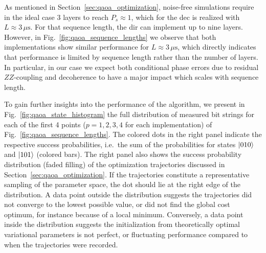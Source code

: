 As mentioned in Section~\ref{sec:qaoa_optimization}, noise-free simulations require in the ideal case 3 layers to reach $P_s \approx 1$, which for the \gls{dec} is realized with $L \approx 3\, \mu\text{s}$. For that sequence length, the \gls{dir} can implement up to nine layers. However, in Fig.~\ref{fig:qaoa_sequence_lengths} we observe that both implementations show similar performance for $L \approx 3\, \mu\text{s}$, which directly indicates that performance is limited by sequence length rather than the number of layers.
In particular, in our case we expect both conditional phase errors due to residual $ZZ$-coupling and decoherence to have a major impact which scales with sequence length.

To gain further insights into the performance of the algorithm, we present in Fig.~\ref{fig:qaoa_state_histogram} the full distribution of measured bit strings for each of the first 4 points ($p=1,2,3,4$ for each implementation) of Fig.~\ref{fig:qaoa_sequence_lengths}. The colored dots in the right panel indicate the respective success probabilities, i.e.\ the sum of the probabilities for states $\ket{010}$ and $\ket{101}$ (colored bars). The right panel also shows the success probability distribution (faded filling) of the optimization trajectories discussed in Section~\ref{sec:qaoa_optimization}. If the trajectories constitute a representative sampling of the parameter space, the dot should lie at the right edge of the distribution. A data point outside the distribution suggests the trajectories did not converge to the lowest possible value, or did not find the global cost optimum, for instance because of a local minimum. Conversely, a data point inside the distribution suggests the initialization from theoretically optimal variational parameters is not perfect, or fluctuating performance compared to when the trajectories were recorded.

